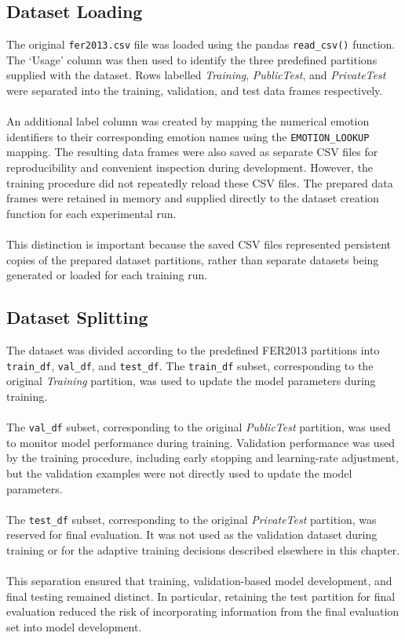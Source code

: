 \documentclass[12pt, a4paper]{report}
\let\oldsubsection\subsection
\renewcommand{\subsection}{%
    \Needspace{6\baselineskip}%
    \oldsubsection
}
\begin{document}
			\subsection{Dataset Loading}
				
				The original \texttt{fer2013.csv} file was loaded using the pandas \texttt{read\_csv()} function. The `Usage' column was then used to identify the three predefined partitions supplied with the dataset. Rows labelled \textit{Training}, \textit{PublicTest}, and \textit{PrivateTest} were separated into the training, validation, and test data frames respectively.\\\\
				An additional label column was created by mapping the numerical emotion identifiers to their corresponding emotion names using the \texttt{EMOTION\_LOOKUP} mapping. The resulting data frames were also saved as separate CSV files for reproducibility and convenient inspection during development. However, the training procedure did not repeatedly reload these CSV files. The prepared data frames were retained in memory and supplied directly to the dataset creation function for each experimental run.\\\\
				This distinction is important because the saved CSV files represented persistent copies of the prepared dataset partitions, rather than separate datasets being generated or loaded for each training run.
				
			\newpage
			\subsection{Dataset Splitting}
				
				The dataset was divided according to the predefined FER2013 partitions into \texttt{train\_df}, \texttt{val\_df}, and \texttt{test\_df}. The \texttt{train\_df} subset, corresponding to the original \textit{Training} partition, was used to update the model parameters during training.\\\\
				The \texttt{val\_df} subset, corresponding to the original \textit{PublicTest} partition, was used to monitor model performance during training. Validation performance was used by the training procedure, including early stopping and learning-rate adjustment, but the validation examples were not directly used to update the model parameters.\\\\
				The \texttt{test\_df} subset, corresponding to the original \textit{PrivateTest} partition, was reserved for final evaluation. It was not used as the validation dataset during training or for the adaptive training decisions described elsewhere in this chapter.\\\\
				This separation ensured that training, validation-based model development, and final testing remained distinct. In particular, retaining the test partition for final evaluation reduced the risk of incorporating information from the final evaluation set into model development.
				
\end{document}
